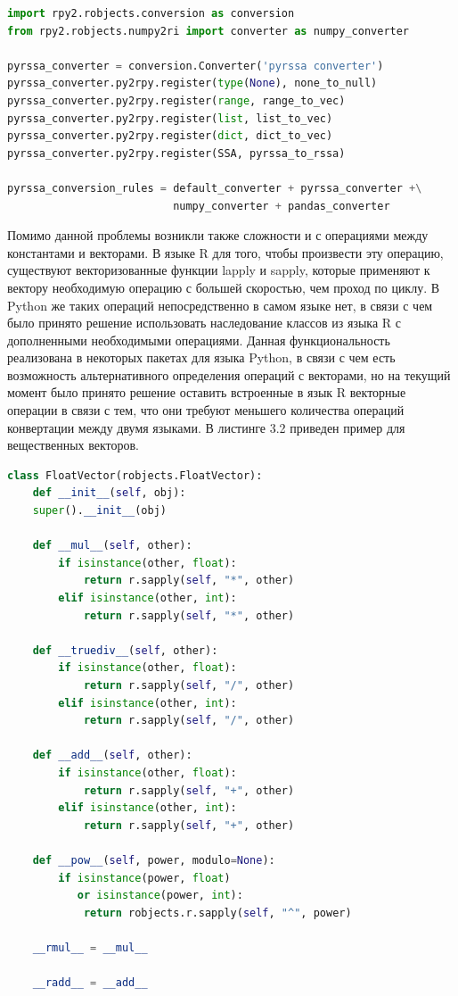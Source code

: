 \documentclass[specialist,
			   substylefile = spbu_report.rtx,
			   subf,href,colorlinks=true, 12pt]{disser}
\begin{document}
\noindent
\begin{minipage}{\linewidth}
\begin{lstlisting}[language=Python, caption=Конвертация из Python в R.]
import rpy2.robjects.conversion as conversion
from rpy2.robjects.numpy2ri import converter as numpy_converter

pyrssa_converter = conversion.Converter('pyrssa converter')
pyrssa_converter.py2rpy.register(type(None), none_to_null)
pyrssa_converter.py2rpy.register(range, range_to_vec)
pyrssa_converter.py2rpy.register(list, list_to_vec)
pyrssa_converter.py2rpy.register(dict, dict_to_vec)
pyrssa_converter.py2rpy.register(SSA, pyrssa_to_rssa)

pyrssa_conversion_rules = default_converter + pyrssa_converter +\
                          numpy_converter + pandas_converter
\end{lstlisting}
\end{minipage}

Помимо данной проблемы возникли также сложности и с операциями между константами и векторами. В языке R для того, чтобы произвести эту операцию, существуют векторизованные функции lapply и sapply, которые применяют к вектору необходимую операцию с большей скоростью, чем проход по циклу. В Python же таких операций непосредственно в самом языке нет, в связи с чем было принято решение использовать наследование классов из языка R с дополненными необходимыми операциями. Данная функциональность реализована в некоторых пакетах \cite{habr-doc} для языка Python, в связи с чем есть возможность альтернативного определения операций с векторами, но на текущий момент было принято решение оставить встроенные в язык R векторные операции в связи с тем, что они требуют меньшего количества операций конвертации между двумя языками. В листинге 3.2 приведен пример для вещественных векторов.

\begin{lstlisting}[language=Python, caption=Наследование для FloatVector.]
class FloatVector(robjects.FloatVector):
	def __init__(self, obj):
	super().__init__(obj)
	
	def __mul__(self, other):
		if isinstance(other, float):
			return r.sapply(self, "*", other)
		elif isinstance(other, int):
			return r.sapply(self, "*", other)
	
	def __truediv__(self, other):
		if isinstance(other, float):
			return r.sapply(self, "/", other)
		elif isinstance(other, int):
			return r.sapply(self, "/", other)
	
	def __add__(self, other):
		if isinstance(other, float):
			return r.sapply(self, "+", other)
		elif isinstance(other, int):
			return r.sapply(self, "+", other)
	
 	def __pow__(self, power, modulo=None):
		if isinstance(power, float) 
		   or isinstance(power, int):
			return robjects.r.sapply(self, "^", power)
	
	__rmul__ = __mul__
	
	__radd__ = __add__	
\end{lstlisting}
\end{document}
